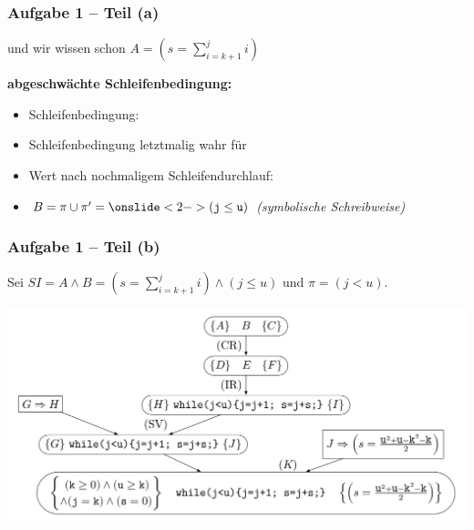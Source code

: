 \documentclass{beamer}
\begin{document}
\begin{frame}[t] \frametitle{Aufgabe 1 -- Teil (a)}
	 und wir wissen schon $A = (s = \sum\limits_{i = k+1}^j i)$
	
	\bigskip
	
	\textbf{abgeschwächte Schleifenbedingung:}
	\begin{itemize}
		\item Schleifenbedingung: \onslide<2->{$\pi = (\texttt{j < u})$}
		\item Schleifenbedingung letztmalig wahr für \onslide<2->{\texttt{j = u - 1}}
		\item Wert nach nochmaligem Schleifendurchlauf: \onslide<2->{$\pi' = (\texttt{j = u})$}
		\item $B = \pi \cup \pi' = \onslide<2->{(\texttt{j} \le \texttt{u})}$ \hspace{1cm} {\footnotesize \itshape (symbolische Schreibweise)}
	\end{itemize}
	\medskip
	\pause
\end{frame}

\begin{frame}[t] \frametitle{Aufgabe 1 -- Teil (b)}
	\small	
	Sei $SI = A \land B = \left( s = \sum\limits_{i = k+1}^j i \right) \land (j \le u)$ und $\pi = (j < u)$.
	
	\begin{center}
		\includegraphics[width=\linewidth]{tut12-aufgabe1-baum.png}
	\end{center}
\end{frame}
\end{document}
